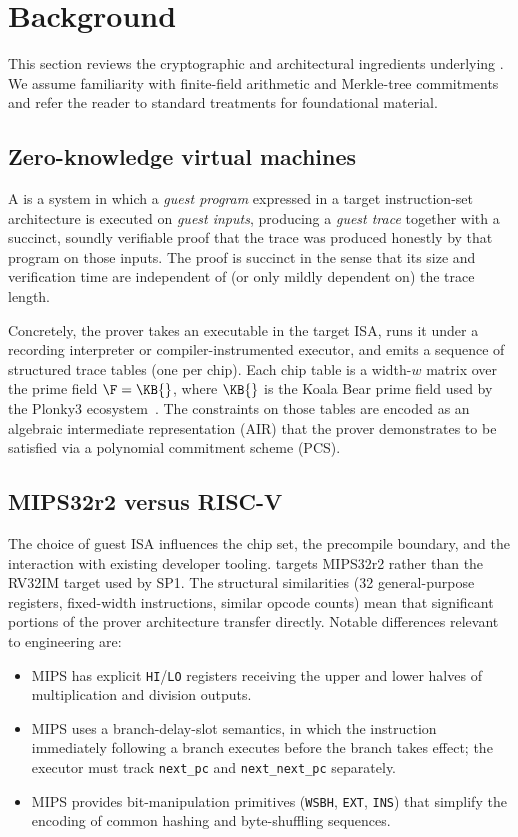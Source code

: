 \section{Background}
\label{sec:background}

This section reviews the cryptographic and architectural ingredients underlying \Zirenver{}. We assume familiarity with finite-field arithmetic and Merkle-tree commitments and refer the reader to standard treatments for foundational material.

\subsection{Zero-knowledge virtual machines}

A \zkVM{} is a system in which a \emph{guest program} expressed in a target instruction-set architecture is executed on \emph{guest inputs}, producing a \emph{guest trace} together with a succinct, soundly verifiable proof that the trace was produced honestly by that program on those inputs. The proof is succinct in the sense that its size and verification time are independent of (or only mildly dependent on) the trace length.

Concretely, the prover takes an executable in the target ISA, runs it under a recording interpreter or compiler-instrumented executor, and emits a sequence of structured trace tables (one per chip). Each chip table is a width-$w$ matrix over the prime field $\F = \KB{}$, where $\KB{}$ is the Koala Bear prime field used by the Plonky3 ecosystem~\citep{plonky3}. The constraints on those tables are encoded as an algebraic intermediate representation (AIR) that the prover demonstrates to be satisfied via a polynomial commitment scheme (PCS).

\subsection{MIPS32r2 versus RISC-V}

The choice of guest ISA influences the chip set, the precompile boundary, and the interaction with existing developer tooling. \Ziren{} targets MIPS32r2 rather than the RV32IM target used by SP1. The structural similarities (32 general-purpose registers, fixed-width instructions, similar opcode counts) mean that significant portions of the prover architecture transfer directly. Notable differences relevant to \zkVM{} engineering are:
\begin{itemize}
  \item MIPS has explicit \texttt{HI}/\texttt{LO} registers receiving the upper and lower halves of multiplication and division outputs.
  \item MIPS uses a branch-delay-slot semantics, in which the instruction immediately following a branch executes before the branch takes effect; the executor must track \texttt{next\_pc} and \texttt{next\_next\_pc} separately.
  \item MIPS provides bit-manipulation primitives (\texttt{WSBH}, \texttt{EXT}, \texttt{INS}) that simplify the encoding of common hashing and byte-shuffling sequences.
\end{itemize}

